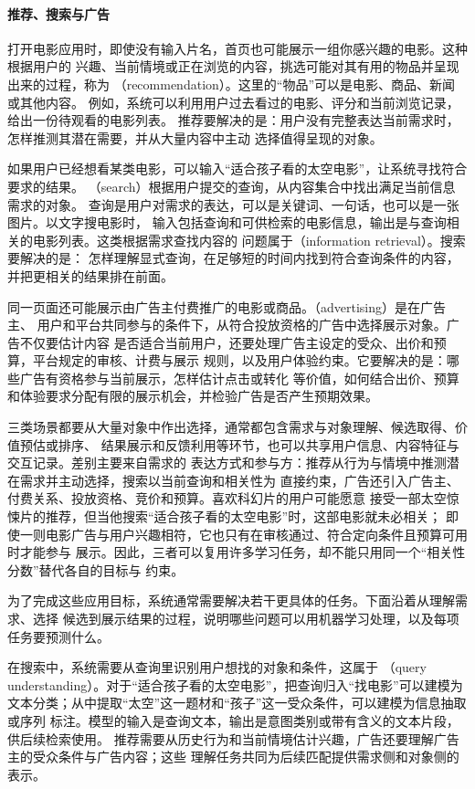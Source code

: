 \paragraph{推荐、搜索与广告}
打开电影应用时，即使没有输入片名，首页也可能展示一组你感兴趣的电影。这种根据用户的
兴趣、当前情境或正在浏览的内容，挑选可能对其有用的物品并呈现出来的过程，称为
（recommendation）。这里的“物品”可以是电影、商品、新闻或其他内容。
例如，系统可以利用用户过去看过的电影、评分和当前浏览记录，给出一份待观看的电影列表。
推荐要解决的是：用户没有完整表达当前需求时，怎样推测其潜在需要，并从大量内容中主动
选择值得呈现的对象。

如果用户已经想看某类电影，可以输入“适合孩子看的太空电影”，让系统寻找符合要求的结果。
（search）根据用户提交的查询，从内容集合中找出满足当前信息需求的对象。
查询是用户对需求的表达，可以是关键词、一句话，也可以是一张图片。以文字搜电影时，
输入包括查询和可供检索的电影信息，输出是与查询相关的电影列表。这类根据需求查找内容的
问题属于（information retrieval）。搜索要解决的是：
怎样理解显式查询，在足够短的时间内找到符合查询条件的内容，并把更相关的结果排在前面。

同一页面还可能展示由广告主付费推广的电影或商品。（advertising）是在广告主、
用户和平台共同参与的条件下，从符合投放资格的广告中选择展示对象。广告不仅要估计内容
是否适合当前用户，还要处理广告主设定的受众、出价和预算，平台规定的审核、计费与展示
规则，以及用户体验约束。它要解决的是：哪些广告有资格参与当前展示，怎样估计点击或转化
等价值，如何结合出价、预算和体验要求分配有限的展示机会，并检验广告是否产生预期效果。

三类场景都要从大量对象中作出选择，通常都包含需求与对象理解、候选取得、价值预估或排序、
结果展示和反馈利用等环节，也可以共享用户信息、内容特征与交互记录。差别主要来自需求的
表达方式和参与方：推荐从行为与情境中推测潜在需求并主动选择，搜索以当前查询和相关性为
直接约束，广告还引入广告主、付费关系、投放资格、竞价和预算。喜欢科幻片的用户可能愿意
接受一部太空惊悚片的推荐，但当他搜索“适合孩子看的太空电影”时，这部电影就未必相关；
即使一则电影广告与用户兴趣相符，它也只有在审核通过、符合定向条件且预算可用时才能参与
展示。因此，三者可以复用许多学习任务，却不能只用同一个“相关性分数”替代各自的目标与
约束。

为了完成这些应用目标，系统通常需要解决若干更具体的任务。下面沿着从理解需求、选择
候选到展示结果的过程，说明哪些问题可以用机器学习处理，以及每项任务要预测什么。

在搜索中，系统需要从查询里识别用户想找的对象和条件，这属于
（query understanding）。对于“适合孩子看的太空电影”，把查询归入“找电影”可以建模为
文本分类；从中提取“太空”这一题材和“孩子”这一受众条件，可以建模为信息抽取或序列
标注。模型的输入是查询文本，输出是意图类别或带有含义的文本片段，供后续检索使用。
推荐需要从历史行为和当前情境估计兴趣，广告还要理解广告主的受众条件与广告内容；这些
理解任务共同为后续匹配提供需求侧和对象侧的表示。

